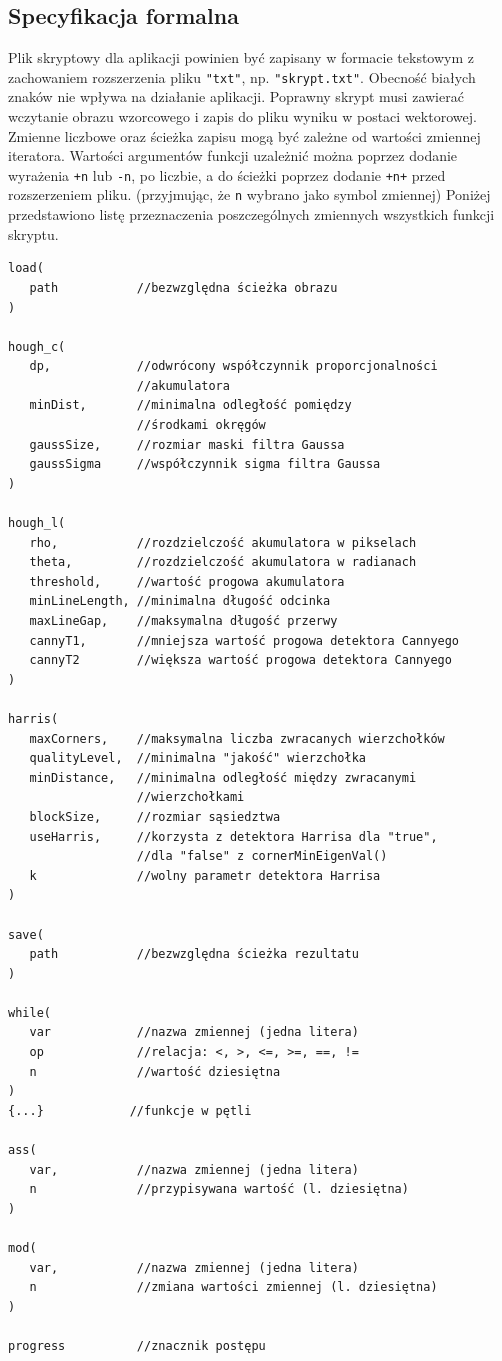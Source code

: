 \documentclass[11pt,a4paper]{article}
\begin{document}
\subsection{Specyfikacja formalna}\label{zmienne}
Plik skryptowy dla aplikacji powinien być zapisany w formacie tekstowym z zachowaniem rozszerzenia pliku {\tt "txt"}, np. {\tt "skrypt.txt"}. Obecność białych znaków nie wpływa na działanie aplikacji. Poprawny skrypt musi zawierać wczytanie obrazu wzorcowego i zapis do pliku wyniku w postaci wektorowej. Zmienne liczbowe oraz ścieżka zapisu mogą być zależne od wartości zmiennej iteratora. Wartości argumentów funkcji uzależnić można poprzez dodanie wyrażenia {\tt +n} lub {\tt -n}, po liczbie, a do ścieżki poprzez dodanie {\tt +n+} przed rozszerzeniem pliku. (przyjmując, że {\tt n} wybrano jako symbol zmiennej) Poniżej przedstawiono listę przeznaczenia poszczególnych zmiennych wszystkich funkcji skryptu.
\begin{verbatim}
load(
   path           //bezwzględna ścieżka obrazu
)

hough_c(
   dp,            //odwrócony współczynnik proporcjonalności
                  //akumulatora
   minDist,       //minimalna odległość pomiędzy
                  //środkami okręgów
   gaussSize,     //rozmiar maski filtra Gaussa
   gaussSigma     //współczynnik sigma filtra Gaussa
)

hough_l(
   rho,           //rozdzielczość akumulatora w pikselach
   theta,         //rozdzielczość akumulatora w radianach
   threshold,     //wartość progowa akumulatora
   minLineLength, //minimalna długość odcinka
   maxLineGap,    //maksymalna długość przerwy
   cannyT1,       //mniejsza wartość progowa detektora Cannyego
   cannyT2        //większa wartość progowa detektora Cannyego
)

harris(
   maxCorners,    //maksymalna liczba zwracanych wierzchołków
   qualityLevel,  //minimalna "jakość" wierzchołka
   minDistance,   //minimalna odległość między zwracanymi
                  //wierzchołkami
   blockSize,     //rozmiar sąsiedztwa
   useHarris,     //korzysta z detektora Harrisa dla "true",
                  //dla "false" z cornerMinEigenVal() 
   k              //wolny parametr detektora Harrisa
)

save(
   path           //bezwzględna ścieżka rezultatu
)

while(
   var            //nazwa zmiennej (jedna litera)
   op             //relacja: <, >, <=, >=, ==, !=
   n              //wartość dziesiętna
)
{...}            //funkcje w pętli

ass(
   var,           //nazwa zmiennej (jedna litera)
   n              //przypisywana wartość (l. dziesiętna)
)

mod(              
   var,           //nazwa zmiennej (jedna litera)
   n              //zmiana wartości zmiennej (l. dziesiętna)
)

progress          //znacznik postępu
\end{verbatim}
\end{document}
